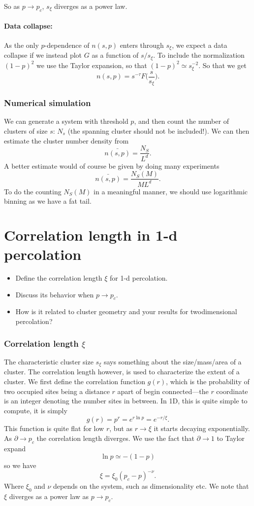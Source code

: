 \documentclass[a4paper, 11pt, notitlepage, english]{article}
\newcommand{\p}{\partial}
\begin{document}
So as $p\to p_c$, $s_\xi$ diverges as a power law.

\paragraph{Data collapse:} As the only $p$-dependence of $n(s,p)$ enters through $s_\xi$, we expect a data collapse if we instead plot $G$ as a function of $s/s_\xi$. To include the normalization $(1-p)^2$ we use the Taylor expansion, so that $(1-p)^2 \simeq s_\xi^{-2}$. So that we get
$$n(s,p) = s^{-\tau} F\bigg(\frac{s}{s_\xi}\bigg).$$

\subsubsection*{Numerical simulation}

We can generate a system with threshold $p$, and then count the number of clusters of size $s$: $N_s$ (the spanning cluster should not be included!). We can then estimate the cluster number density from
$$\bar{n(s,p)} = \frac{N_S}{L^d}.$$
A better estimate would of course be given by doing many experiments
$$\bar{n(s,p)} = \frac{N_S(M)}{ML^d}.$$
To do the counting $N_S(M)$ in a meaningful manner, we should use logarithmic binning as we have a fat tail.

\clearpage

\section{Correlation length in 1-d percolation}
\begin{itemize}
	\item Define the correlation length $\xi$ for 1-d percolation.
	\item Discuss its behavior when $p \to p_c$. 
	\item How is it related to cluster geometry and your results for twodimensional percolation?	
\end{itemize}

\subsubsection*{Correlation length $\xi$}

The characteristic cluster size $s_\xi$ says something about the size/mass/area of a cluster. The correlation length however, is used to characterize the extent of a cluster. We first define the correlation function $g(r)$, which is the probability of two occupied sites being a distance $r$ apart of begin connected---the $r$ coordinate is an integer denoting the number sites in between. In 1D, this is quite simple to compute, it is simply
$$g(r) = p^r = e^{r \ln p} = e^{-r/\xi}.$$
This function is quite flat for low $r$, but as $r\to \xi$ it starts decaying exponentially. As $\p \to p_c$ the correlation length diverges. We use the fact that $\p \to 1$ to Taylor expand
$$\ln p \simeq - (1-p)$$
so we have
$$\xi = \xi_0 (p_c - p)^{-\nu}.$$
Where $\xi_0$ and $\nu$ depends on the system, such as dimensionality etc. We note that $\xi$ diverges as a power law as $p \to p_c$.
\end{document}

